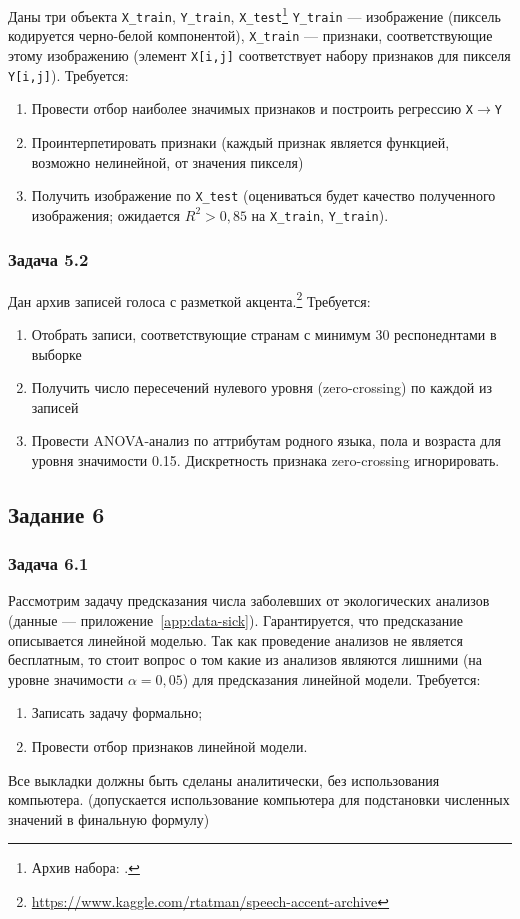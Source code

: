 Даны три объекта \texttt{X\_train}, \texttt{Y\_train}, \texttt{X\_test}\footnote{Архив набора: .}
\texttt{Y\_train} --- изображение (пиксель кодируется черно-белой компонентой), \texttt{X\_train} --- признаки, соответствующие этому изображению (элемент \texttt{X[i,j]} соответствует набору признаков для пикселя \texttt{Y[i,j]}).
Требуется:
\begin{enumerate}
    \item Провести отбор наиболее значимых признаков и построить регрессию \texttt{X}$\to$\texttt{Y}
    \item Проинтерпетировать признаки (каждый признак является функцией, возможно нелинейной, от значения пикселя)
    \item Получить изображение по \texttt{X\_test} (оцениваться будет качество полученного изображения; ожидается $R^2>0{,}85$ на \texttt{X\_train}, \texttt{Y\_train}).
\end{enumerate}

\subsubsection{Задача 5.2}

Дан архив записей голоса с разметкой акцента.\footnote{\url{https://www.kaggle.com/rtatman/speech-accent-archive}}
Требуется: 
\begin{enumerate}
    \item Отобрать записи, соответствующие странам с минимум 30 респонеднтами в выборке
    \item Получить число пересечений нулевого уровня (zero-crossing) по каждой из записей
    \item Провести ANOVA-анализ по аттрибутам родного языка, пола и возраста для уровня значимости 0.15. Дискретность признака zero-crossing игнорировать.
\end{enumerate}


\subsection{Задание 6}


\subsubsection{Задача 6.1}

Рассмотрим задачу предсказания числа заболевших от экологических анализов (данные --- приложение~\ref{app:data-sick}). Гарантируется, что предсказание описывается линейной моделью.
Так как проведение анализов не является бесплатным, то стоит вопрос о том какие из анализов являются лишними (на уровне значимости $\alpha=0{,}05$) для предсказания линейной модели.
Требуется:
\begin{enumerate}
    \item Записать задачу формально;
    \item Провести отбор признаков линейной модели.
\end{enumerate}
Все выкладки должны быть сделаны аналитически, без использования компьютера. (допускается использование компьютера для подстановки численных значений в финальную формулу)

